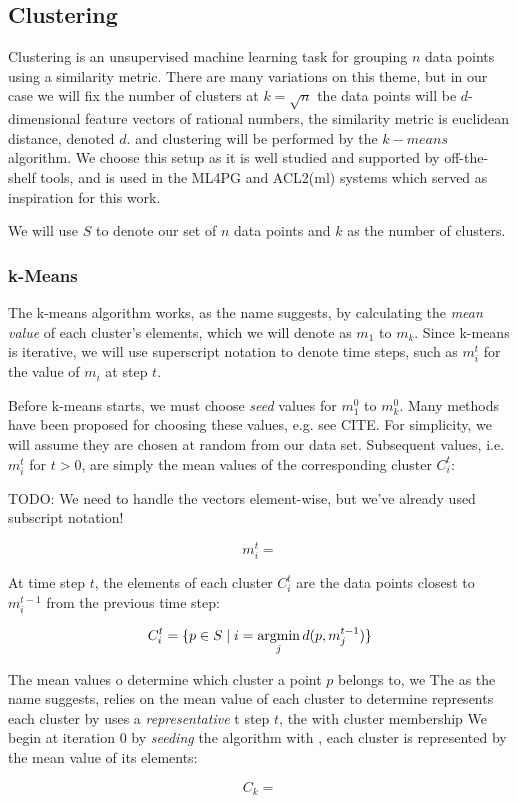 \subsection{Clustering}
\label{sec:clustering}

Clustering is an unsupervised machine learning task for grouping $n$ data points using a similarity metric. There are many variations on this theme, but in our case we will fix the number of clusters at \iffalse TODO: use ceiling brackets \fi $k = \sqrt{n}$ the data points will be $d$-dimensional feature vectors of rational numbers, the similarity metric is euclidean distance, denoted $d$. and clustering will be performed by the $k-means$ algorithm. We choose this setup as it is well studied and supported by off-the-shelf tools, and is used in the ML4PG and ACL2(ml) systems which served as inspiration for this work.

We will use $S$ to denote our set of $n$ data points and $k$ as the number of clusters.

\subsubsection{k-Means}

The k-means algorithm works, as the name suggests, by calculating the \emph{mean value} of each cluster's elements, which we will denote as $m_1$ to $m_k$. Since k-means is iterative, we will use superscript notation to denote time steps, such as $m_i^t$ for the value of $m_i$ at step $t$.

Before k-means starts, we must choose \emph{seed} values for $m_1^0$ to $m_k^0$. Many methods have been proposed for choosing these values, e.g. see CITE. For simplicity, we will assume they are chosen at random from our data set. Subsequent values, i.e. $m_i^t$ for $t > 0$, are simply the mean values of the corresponding cluster $C_i^t$:

TODO: We need to handle the vectors element-wise, but we've already used subscript notation!

\begin{equation}
  m_i^t =
\end{equation}

At time step $t$, the elements of each cluster $C_i^t$ are the data points closest to $m_i^{t-1}$ from the previous time step:

\begin{equation}
  C_i^t = \{ p \in S \mid i = \argmin\limits_j d(p, m_j^{t-1}) \}
\end{equation}

The mean values o determine which cluster a point $p$ belongs to, we
The as the name suggests, relies on the mean value of each cluster to determine  represents each cluster by uses a \emph{representative} t step $t$, the with cluster membership  We begin at iteration 0 by \emph{seeding} the algorithm with , each cluster is represented by the mean value of its elements:

\begin{equation}
  C_k =
\end{equation}
